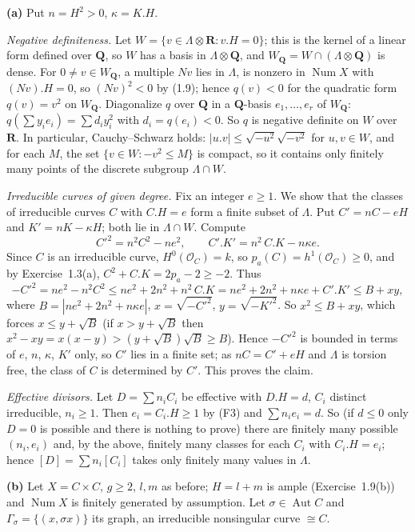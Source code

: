 \documentclass[11pt]{article}
\begin{document}
\textbf{(a)} Put $n=H^2>0$, $\kappa=K.H$.

\emph{Negative definiteness.} Let $W=\{v\in\Lambda\otimes\mathbf R:v.H=0\}$; this is the kernel of a linear form defined over $\mathbf Q$, so $W$ has a basis in $\Lambda\otimes\mathbf Q$, and $W_{\mathbf Q}=W\cap(\Lambda\otimes\mathbf Q)$ is dense. For $0\ne v\in W_{\mathbf Q}$, a multiple $Nv$ lies in $\Lambda$, is nonzero in $\operatorname{Num}X$ with $(Nv).H=0$, so $(Nv)^2<0$ by (1.9); hence $q(v)<0$ for the quadratic form $q(v)=v^2$ on $W_{\mathbf Q}$. Diagonalize $q$ over $\mathbf Q$ in a $\mathbf Q$-basis $e_1,\dots,e_r$ of $W_{\mathbf Q}$: $q(\sum y_ie_i)=\sum d_iy_i^2$ with $d_i=q(e_i)<0$. So $q$ is negative definite on $W$ over $\mathbf R$. In particular, Cauchy--Schwarz holds: $|u.v|\le\sqrt{-u^2}\sqrt{-v^2}$ for $u,v\in W$, and for each $M$, the set $\{v\in W:-v^2\le M\}$ is compact, so it contains only finitely many points of the discrete subgroup $\Lambda\cap W$.

\emph{Irreducible curves of given degree.} Fix an integer $e\ge1$. We show that the classes of irreducible curves $C$ with $C.H=e$ form a finite subset of $\Lambda$. Put $C'=nC-eH$ and $K'=nK-\kappa H$; both lie in $\Lambda\cap W$. Compute
\[ C'^2=n^2C^2-ne^2,\qquad C'.K'=n^2\,C.K-n\kappa e. \]
Since $C$ is an irreducible curve, $H^0(\mathcal O_C)=k$, so $p_a(C)=h^1(\mathcal O_C)\ge0$, and by Exercise~1.3(a), $C^2+C.K=2p_a-2\ge-2$. Thus
\[ -C'^2=ne^2-n^2C^2\le ne^2+2n^2+n^2\,C.K=ne^2+2n^2+n\kappa e+C'.K'\le B+xy, \]
where $B=|ne^2+2n^2+n\kappa e|$, $x=\sqrt{-C'^2}$, $y=\sqrt{-K'^2}$. So $x^2\le B+xy$, which forces $x\le y+\sqrt B$ (if $x>y+\sqrt B$ then $x^2-xy=x(x-y)>(y+\sqrt B)\sqrt B\ge B$). Hence $-C'^2$ is bounded in terms of $e$, $n$, $\kappa$, $K'$ only, so $C'$ lies in a finite set; as $nC=C'+eH$ and $\Lambda$ is torsion free, the class of $C$ is determined by $C'$. This proves the claim.

\emph{Effective divisors.} Let $D=\sum n_iC_i$ be effective with $D.H=d$, $C_i$ distinct irreducible, $n_i\ge1$. Then $e_i=C_i.H\ge1$ by (F3) and $\sum n_ie_i=d$. So (if $d\le0$ only $D=0$ is possible and there is nothing to prove) there are finitely many possible $(n_i,e_i)$ and, by the above, finitely many classes for each $C_i$ with $C_i.H=e_i$; hence $[D]=\sum n_i[C_i]$ takes only finitely many values in $\Lambda$.

\textbf{(b)} Let $X=C\times C$, $g\ge2$, $l,m$ as before; $H=l+m$ is ample (Exercise~1.9(b)) and $\operatorname{Num}X$ is finitely generated by assumption. Let $\sigma\in\operatorname{Aut}C$ and $\Gamma_\sigma=\{(x,\sigma x)\}$ its graph, an irreducible nonsingular curve $\cong C$.
\end{document}
